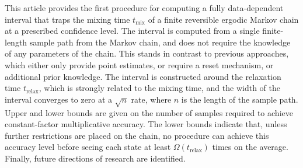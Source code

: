 This article provides the first procedure for computing a fully
data-dependent interval that traps the mixing time
$t_{\text{mix}}$ of a finite
reversible ergodic Markov chain at a prescribed confidence level.  The
interval is computed from a single finite-length sample path from the
Markov chain, and does not require the knowledge of any parameters of
the chain.  This stands in contrast to previous approaches, which
either only provide point estimates, or require a reset mechanism, or
additional prior knowledge.
The interval is constructed around the relaxation time
$t_{\text{relax}}$, which is strongly related to the mixing time, and
the width of the interval converges to zero
at a $\sqrt{n}$ rate, where $n$ is the length of the sample path.
Upper and lower bounds are given on the number of samples required to
achieve constant-factor multiplicative accuracy.  The lower bounds
indicate that, unless further restrictions are placed on the chain, no
procedure can achieve this accuracy level before seeing each state at
least $\Omega(t_{\text{relax}})$ times on the average.  Finally, future
directions of research are identified.

